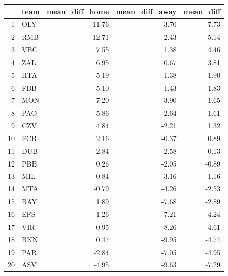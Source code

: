 \begin{table}[ht]
\centering
\begin{tabular}{rlrrr}
  \hline
 & team & mean\_diff\_home & mean\_diff\_away & mean\_diff \\ 
  \hline
1 & OLY & 11.76 & 3.70 & 7.73 \\ 
  2 & RMB & 12.71 & -2.43 & 5.14 \\ 
  3 & VBC & 7.55 & 1.38 & 4.46 \\ 
  4 & ZAL & 6.95 & 0.67 & 3.81 \\ 
  5 & HTA & 5.19 & -1.38 & 1.90 \\ 
  6 & FBB & 5.10 & -1.43 & 1.83 \\ 
  7 & MON & 7.20 & -3.90 & 1.65 \\ 
  8 & PAO & 5.86 & -2.64 & 1.61 \\ 
  9 & CZV & 4.84 & -2.21 & 1.32 \\ 
  10 & FCB & 2.16 & -0.37 & 0.89 \\ 
  11 & DUB & 2.84 & -2.58 & 0.13 \\ 
  12 & PBB & 0.26 & -2.05 & -0.89 \\ 
  13 & MIL & 0.84 & -3.16 & -1.16 \\ 
  14 & MTA & -0.79 & -4.26 & -2.53 \\ 
  15 & BAY & 1.89 & -7.68 & -2.89 \\ 
  16 & EFS & -1.26 & -7.21 & -4.24 \\ 
  17 & VIR & -0.95 & -8.26 & -4.61 \\ 
  18 & BKN & 0.47 & -9.95 & -4.74 \\ 
  19 & PAR & -2.84 & -7.05 & -4.95 \\ 
  20 & ASV & -4.95 & -9.63 & -7.29 \\ 
   \hline
\end{tabular}
\end{table}
